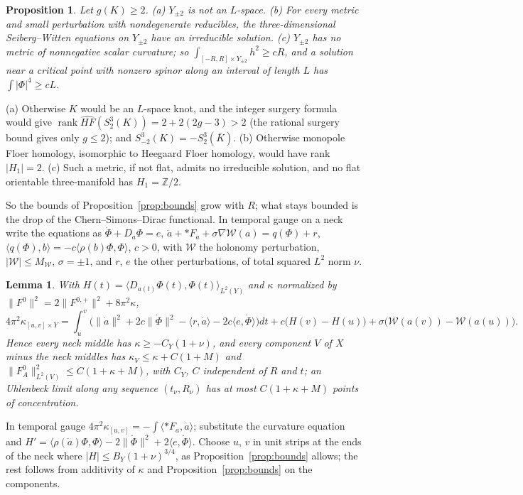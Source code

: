 \documentclass[10pt]{amsart}
\makeatletter
\numberwithin{equation}{section}
\theoremstyle{compact}
\newtheorem{proposition}[theorem]{Proposition}
\newtheorem{lemma}[theorem]{Lemma}
\renewenvironment{proof}[1][\proofname]{\par\pushQED{\qed}\normalfont
  \topsep4\p@\relax\trivlist\item[\hskip\labelsep\itshape#1\@addpunct{.}]%
  \ignorespaces}{\popQED\endtrivlist\@endpefalse}
\newcommand{\Z}{\mathbb Z}
\newcommand{\cW}{\mathcal W}
\makeatother
\begin{document}
\begin{proposition}\label{prop:Lspace}
Let $g(K)\ge2$. \textup{(a)} $Y_{\pm2}$ is not an $L$-space. \textup{(b)} For
every metric and small perturbation with nondegenerate reducibles, the
three-dimensional Seiberg--Witten equations on $Y_{\pm2}$ have an irreducible
solution. \textup{(c)} $Y_{\pm2}$ has no metric of nonnegative scalar
curvature; so $\int_{[-R,R]\times Y_{\pm2}}h^2\ge cR$, and a solution near a
critical point with nonzero spinor along an interval of length $L$ has
$\int|\Phi|^4\ge cL$.
\end{proposition}

\begin{proof}
(a) Otherwise $K$ would be an $L$-space knot, and the integer surgery formula
\cite{OS} would give $\operatorname{rank}\widehat{HF}(S^3_2(K))=2+2(2g-3)>2$
(the rational surgery bound gives only $g\le2$); and
$S^3_{-2}(K)=-S^3_2(\bar K)$. (b) Otherwise monopole Floer homology,
isomorphic to Heegaard Floer homology, would have rank $|H_1|=2$. (c) Such a
metric, if not flat, admits no irreducible solution, and no flat orientable
three-manifold has $H_1=\Z/2$.
\end{proof}

So the bounds of Proposition~\ref{prop:bounds} grow with $R$; what stays bounded
is the drop of the Chern--Simons--Dirac functional. In temporal gauge on a neck
write the equations as $\dot\Phi+D_a\Phi=e$, $\dot a+{*F_a}+\sigma\nabla\cW(a)=
q(\Phi)+r$, $\langle q(\Phi),b\rangle=-c\langle\rho(b)\Phi,\Phi\rangle$, $c>0$,
with $\cW$ the holonomy perturbation, $|\cW|\le M_\cW$, $\sigma=\pm1$, and $r$,
$e$ the other perturbations, of total squared $L^2$ norm $\nu$.

\begin{lemma}\label{lem:CSD}
With $H(t)=\langle D_{a(t)}\Phi(t),\Phi(t)\rangle_{L^2(Y)}$ and $\kappa$
normalized by $\|F^0\|^2=2\|F^{0,+}\|^2+8\pi^2\kappa$,
\[
4\pi^2\kappa_{[u,v]\times Y}=\int_u^v\bigl(\|\dot a\|^2+2c\|\dot\Phi\|^2
-\langle r,\dot a\rangle-2c\langle e,\dot\Phi\rangle\bigr)dt
+c\bigl(H(v)-H(u)\bigr)+\sigma\bigl(\cW(a(v))-\cW(a(u))\bigr).
\]
Hence every neck middle has $\kappa\ge-C_Y(1+\nu)$, and every component $V$ of
$X$ minus the neck middles has $\kappa_V\le\kappa+C(1+M)$ and
$\|F^0_A\|^2_{L^2(V)}\le C(1+\kappa+M)$, with $C_Y$, $C$ independent of $R$ and
$t$; an Uhlenbeck limit along any sequence $(t_\nu,R_\nu)$ has at most
$C(1+\kappa+M)$ points of concentration.
\end{lemma}

\begin{proof}
In temporal gauge $4\pi^2\kappa_{[u,v]}=-\int\langle{*F_a},\dot a\rangle$;
substitute the curvature equation and $H'=\langle\rho(\dot a)\Phi,\Phi\rangle-
2\|\dot\Phi\|^2+2\langle e,\dot\Phi\rangle$. Choose $u$, $v$ in unit strips at
the ends of the neck where $|H|\le B_Y(1+\nu)^{3/4}$, as
Proposition~\ref{prop:bounds} allows; the rest follows from additivity of
$\kappa$ and Proposition~\ref{prop:bounds} on the components.
\end{proof}
\end{document}
